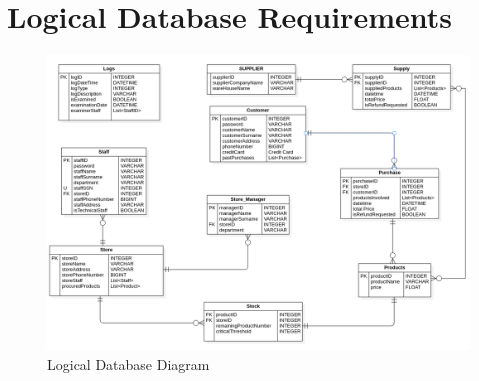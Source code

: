 \section{Logical Database Requirements}

\begin{figure} [H]
    \centering
    \includegraphics[width=\linewidth]{content/specificRequirements/img/LogicalDatabaseDiagram.png}
    \caption{Logical Database Diagram}
    \label{fig:logical_database_diagram}
\end{figure}


